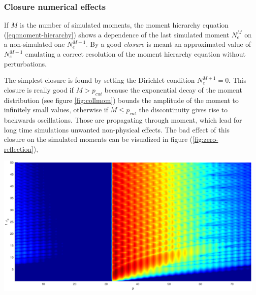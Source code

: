 \documentclass[final]{jpp}
\DeclarePairedDelimiter\abs{\lvert}{\rvert}
\begin{document}
\subsubsection{Closure numerical effects}
If $M$ is the number of simulated moments, the moment hierarchy equation (\ref{eq:moment-hierarchy}) shows a dependence of the last simulated moment $N_e^M$ on a non-simulated one $N_e^{M+1}$. By a good \textit{closure} is meant an approximated value of $N_e^{M+1}$ emulating a correct resolution of the moment hierarchy equation without perturbations. 

\noindent
\begin{minipage}{\textwidth}
\vspace{0.5cm}
\begin{minipage}{0.4\textwidth}
The simplest closure is found by setting the Dirichlet condition $N_e^{M+1} = 0$.
This closure is really good if $M > p_{cut}$ because the exponential decay of the moment distribution (see figure \ref{fig:collmom}) bounds the amplitude of the moment to infinitely small values, otherwise if $M \le p_{cut}$ the discontinuity gives rise to backwards oscillations. Those are propagating through moment, which lead for long time simulations unwanted non-physical effects.
The bad effect of this closure on the simulated moments can be visualized in figure (\ref{fig:zero-reflection}),
\end{minipage}
\hspace{0.05\textwidth}
\begin{minipage}{0.55\textwidth}
\includegraphics[width=\textwidth]{closure_bounce_mod.eps}
\label{fig:zero-reflection}
\end{minipage}
\end{minipage}
\end{document}
